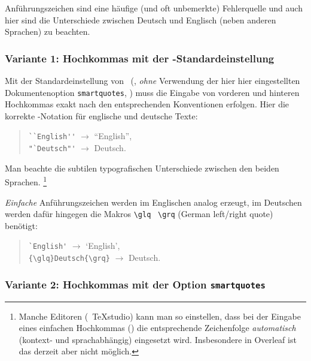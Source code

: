 Anführungszeichen sind eine häufige (und oft unbemerkte) Fehlerquelle und
auch hier sind die Unterschiede zwischen Deutsch und Englisch (neben anderen
Sprachen) zu beachten.

\subsubsection{Variante 1: Hochkommas mit der \latex-Standardeinstellung}

Mit der Standardeinstellung von \latex\ (\dah, \emph{ohne} Verwendung der
hier hier eingestellten Dokumentenoption \texttt{smartquotes}, \su)
muss die Eingabe von vorderen und hinteren Hochkommas exakt nach den
entsprechenden Konventionen erfolgen. Hier die korrekte \latex-Notation für
englische und deutsche Texte:
%
\begin{quote}
    \verb!``English''! $\rightarrow$ ``English'',\\
    \verb!"`Deutsch"'! $\rightarrow$ {\glqq}Deutsch{\grqq}.
\end{quote}
%
Man beachte die subtilen typografischen Unterschiede zwischen den beiden
Sprachen.%
\footnote{Manche Editoren (\zB\ \textsf{TeXstudio}) kann man so einstellen,
    dass bei der Eingabe eines einfachen Hochkommas (\texttt{\textquotedbl})
    die entsprechende Zeichenfolge \emph{automatisch} (kontext- und
    sprachabhängig) eingesetzt wird. Insbesondere in \textsf{Overleaf} ist
    das derzeit aber nicht möglich.}

\emph{Einfache} Anführungszeichen werden im Englischen analog erzeugt,
im Deutschen werden dafür hingegen die Makros \verb!\glq! \bzw\ \verb!\grq!
(German left/right quote) benötigt:
%
\begin{quote}
    \verb!`English'! $\rightarrow$ `English',\\
    \verb!{\glq}Deutsch{\grq}! $\rightarrow$ {\glq}Deutsch{\grq}.
\end{quote}

\subsubsection{Variante 2: Hochkommas mit der Option \texttt{smartquotes}}

